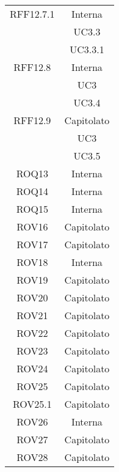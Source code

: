 \begin{longtable}{|c|c|}
\midrule
RFF12.7.1
& Interna\\
& UC3.3\\
& UC3.3.1\\

\midrule
RFF12.8
& Interna\\
& UC3\\
& UC3.4\\

\midrule
RFF12.9
& Capitolato\\
& UC3\\
& UC3.5\\




\midrule
ROQ13
& Interna\\

\midrule
ROQ14
& Interna\\

\midrule
ROQ15
& Interna\\



\midrule
ROV16
& Capitolato\\

\midrule
ROV17
& Capitolato\\

\midrule
ROV18
& Interna\\

\midrule
ROV19
& Capitolato\\

\midrule
ROV20
& Capitolato\\

\midrule
ROV21
& Capitolato\\

\midrule
ROV22
& Capitolato\\

\midrule
ROV23
& Capitolato\\

\midrule
ROV24
& Capitolato\\

\midrule
ROV25
& Capitolato\\

\midrule
ROV25.1
& Capitolato\\

\midrule
ROV26
& Interna\\

\midrule
ROV27
& Capitolato\\

\midrule
ROV28
& Capitolato\\





\end{longtable}

